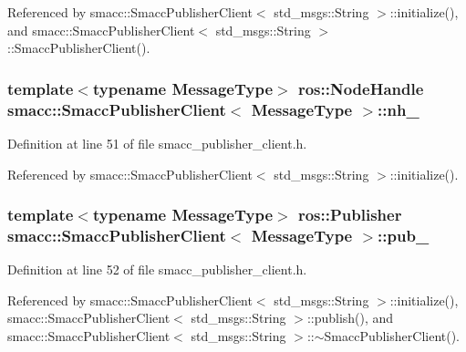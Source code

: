 Referenced by smacc\+::\+Smacc\+Publisher\+Client$<$ std\+\_\+msgs\+::\+String $>$\+::initialize(), and smacc\+::\+Smacc\+Publisher\+Client$<$ std\+\_\+msgs\+::\+String $>$\+::\+Smacc\+Publisher\+Client().

\subsubsection[{\texorpdfstring{nh\+\_\+}{nh_}}]{\setlength{\rightskip}{0pt plus 5cm}template$<$typename Message\+Type$>$ ros\+::\+Node\+Handle {\bf smacc\+::\+Smacc\+Publisher\+Client}$<$ Message\+Type $>$\+::nh\+\_\+\hspace{0.3cm}{\ttfamily [protected]}}\hypertarget{classsmacc_1_1SmaccPublisherClient_a58839abaced6c78596843709ac1b017e}{}\label{classsmacc_1_1SmaccPublisherClient_a58839abaced6c78596843709ac1b017e}


Definition at line 51 of file smacc\+\_\+publisher\+\_\+client.\+h.



Referenced by smacc\+::\+Smacc\+Publisher\+Client$<$ std\+\_\+msgs\+::\+String $>$\+::initialize().

\subsubsection[{\texorpdfstring{pub\+\_\+}{pub_}}]{\setlength{\rightskip}{0pt plus 5cm}template$<$typename Message\+Type$>$ ros\+::\+Publisher {\bf smacc\+::\+Smacc\+Publisher\+Client}$<$ Message\+Type $>$\+::pub\+\_\+\hspace{0.3cm}{\ttfamily [protected]}}\hypertarget{classsmacc_1_1SmaccPublisherClient_a1ed34cdd0001bde76450ab4540b11808}{}\label{classsmacc_1_1SmaccPublisherClient_a1ed34cdd0001bde76450ab4540b11808}


Definition at line 52 of file smacc\+\_\+publisher\+\_\+client.\+h.



Referenced by smacc\+::\+Smacc\+Publisher\+Client$<$ std\+\_\+msgs\+::\+String $>$\+::initialize(), smacc\+::\+Smacc\+Publisher\+Client$<$ std\+\_\+msgs\+::\+String $>$\+::publish(), and smacc\+::\+Smacc\+Publisher\+Client$<$ std\+\_\+msgs\+::\+String $>$\+::$\sim$\+Smacc\+Publisher\+Client().

